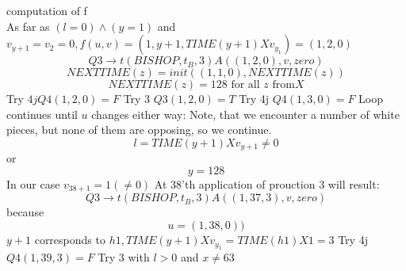 \documentclass[11pt]{article}
\begin{document}
\begin{enumerate}
computation of f\\
As far as $(l = 0) \wedge (y = 1) $ and $v_{y+1} = v_2 = 0, f(u, v) = (1, y+1, TIME(y+1) X v_{y_1}) = (1, 2, 0)$
$$Q3 \rightarrow t(BISHOP, t_B, 3) A((1, 2, 0), v, zero)$$
$$NEXTTIME(z) = init((1, 1, 0), NEXTTIME(z))$$
$$NEXTTIME(z) = 128 \text{ for all } z \text{ from} X$$
Try $4j Q4(1,2, 0) = F$
Try 3 $Q3(1, 2, 0) = T$
Try 4j $Q4(1, 3, 0) = F$
Loop continues until $u$ changes either way: Note, that we encounter a number of white pieces, but none of them are opposing, so we continue. 
$$l = TIME(y+1) X v_{y+1} \not = 0 $$ 
or 
$$y = 128$$
In our case $v_{38+1} = 1(\not = 0)$ At
38'th application of prouction 3 will result: 
$$Q3 \rightarrow t(BISHOP, t_B, 3) A((1, 37, 3), v, zero)$$
because
$$u = (1, 38, 0))$$
$y+1$ corresponds to $h1, TIME(y+1) X v_{y_1} = TIME(h1) X 1 = 3$
Try 4j $Q4(1, 39, 3) = F$
Try 3 with $l > 0 $ and $x \not = 63$


\end{enumerate}
\end{document}

